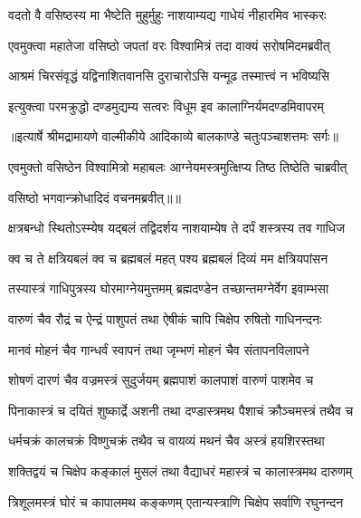 \twolineshloka
{वदतो वै वसिष्ठस्य मा भैष्टेति मुहुर्मुहुः}
{नाशयाम्यद्य गाधेयं नीहारमिव भास्करः} %

\twolineshloka
{एवमुक्त्वा महातेजा वसिष्ठो जपतां वरः}
{विश्वामित्रं तदा वाक्यं सरोषमिदमब्रवीत्} %

\twolineshloka
{आश्रमं चिरसंवृद्धं यद्विनाशितवानसि}
{दुराचारोऽसि यन्मूढ तस्मात्त्वं न भविष्यसि} %

\twolineshloka
{इत्युक्त्वा परमक्रुद्धो दण्डमुद्यम्य सत्वरः}
{विधूम इव कालाग्निर्यमदण्डमिवापरम्} %


{॥इत्यार्षे श्रीमद्रामायणे वाल्मीकीये आदिकाव्ये बालकाण्डे चतुःपञ्चाशत्तमः सर्गः॥}


\twolineshloka
{एवमुक्तो वसिष्ठेन विश्वामित्रो महाबलः}
{आग्नेयमस्त्रमुत्क्षिप्य तिष्ठ तिष्ठेति चाब्रवीत्} %

{वसिष्ठो भगवान्क्रोधादिदं वचनमब्रवीत्॥॥} %

\addtocounter{shlokacount}{1}

\twolineshloka
{क्षत्रबन्धो स्थितोऽस्म्येष यद्बलं तद्विदर्शय}
{नाशयाम्येष ते दर्पं शस्त्रस्य तव गाधिज} %

\twolineshloka
{क्व च ते क्षत्रियबलं क्व च ब्रह्मबलं महत्}
{पश्य ब्रह्मबलं दिव्यं मम क्षत्रियपांसन} %

\twolineshloka
{तस्यास्त्रं गाधिपुत्रस्य घोरमाग्नेयमुत्तमम्}
{ब्रह्मदण्डेन तच्छान्तमग्नेर्वेग इवाम्भसा} %

\twolineshloka
{वारुणं चैव रौद्रं च ऐन्द्रं पाशुपतं तथा}
{ऐषीकं चापि चिक्षेप रुषितो गाधिनन्दनः} %

\twolineshloka
{मानवं मोहनं चैव गान्धर्वं स्वापनं तथा}
{जृम्भणं मोहनं चैव संतापनविलापने} %

\twolineshloka
{शोषणं दारणं चैव वज्रमस्त्रं सुदुर्जयम्}
{ब्रह्मपाशं कालपाशं वारुणं पाशमेव च} %

\twolineshloka
{पिनाकास्त्रं च दयितं शुष्कार्द्रे अशनी तथा}
{दण्डास्त्रमथ पैशाचं क्रौञ्चमस्त्रं तथैव च} %

\twolineshloka
{धर्मचक्रं कालचक्रं विष्णुचक्रं तथैव च}
{वायव्यं मथनं चैव अस्त्रं हयशिरस्तथा} %

\twolineshloka
{शक्तिद्वयं च चिक्षेप कङ्कालं मुसलं तथा}
{वैद्याधरं महास्त्रं च कालास्त्रमथ दारुणम्} %

\twolineshloka
{त्रिशूलमस्त्रं घोरं च कापालमथ कङ्कणम्}
{एतान्यस्त्राणि चिक्षेप सर्वाणि रघुनन्दन} %

